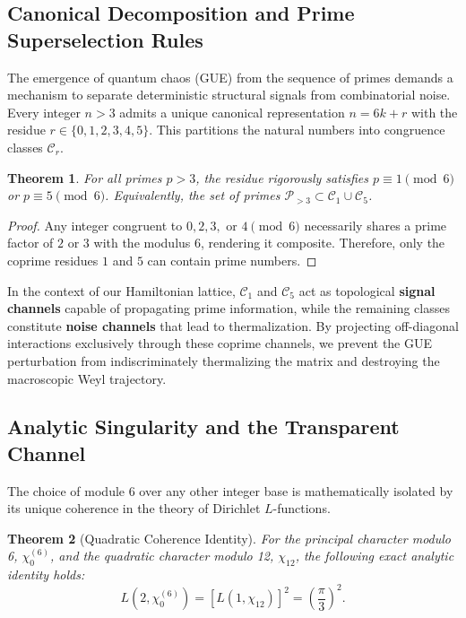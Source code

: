 \documentclass[aps,prl,preprint,superscriptaddress,floatfix]{revtex4-2}
\newtheorem{theorem}{Theorem}[section]
\begin{document}
\subsection{Canonical Decomposition and Prime Superselection Rules}

The emergence of quantum chaos (GUE) from the sequence of primes demands a mechanism to separate deterministic structural signals from combinatorial noise. Every integer $n > 3$ admits a unique canonical representation $n = 6k + r$ with the residue $r \in \{0,1,2,3,4,5\}$. This partitions the natural numbers into congruence classes $\mathcal{C}_r$. 

\begin{theorem}
For all primes $p > 3$, the residue rigorously satisfies $p \equiv 1 \pmod 6$ or $p \equiv 5 \pmod 6$. Equivalently, the set of primes $\mathcal{P}_{>3} \subset \mathcal{C}_1 \cup \mathcal{C}_5$.
\end{theorem}

\begin{proof}
Any integer congruent to $0, 2, 3,$ or $4 \pmod 6$ necessarily shares a prime factor of $2$ or $3$ with the modulus $6$, rendering it composite. Therefore, only the coprime residues $1$ and $5$ can contain prime numbers.
\end{proof}

In the context of our Hamiltonian lattice, $\mathcal{C}_1$ and $\mathcal{C}_5$ act as topological \textbf{signal channels} capable of propagating prime information, while the remaining classes constitute \textbf{noise channels} that lead to thermalization. By projecting off-diagonal interactions exclusively through these coprime channels, we prevent the GUE perturbation from indiscriminately thermalizing the matrix and destroying the macroscopic Weyl trajectory.

\subsection{Analytic Singularity and the Transparent Channel}

The choice of module 6 over any other integer base is mathematically isolated by its unique coherence in the theory of Dirichlet $L$-functions.

\begin{theorem}[Quadratic Coherence Identity]
\label{thm:quadratic}
For the principal character modulo 6, $\chi_0^{(6)}$, and the quadratic character modulo 12, $\chi_{12}$, the following exact analytic identity holds:
\begin{equation}
L(2, \chi_0^{(6)}) = \left[ L(1, \chi_{12}) \right]^2 = \left( \frac{\pi}{3} \right)^2.
\end{equation}
\end{theorem}
\end{document}
